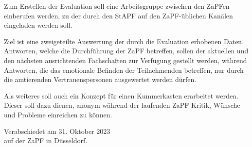 \documentclass[DIV=calc]{scrartcl}
\begin{document}
	Zum Erstellen der Evaluation soll eine Arbeitsgruppe zwischen den ZaPFen einberufen werden, zu der durch den StAPF auf den ZaPF-üblichen Kanälen eingeladen werden soll.
	
	Ziel ist eine zweigeteilte Auswertung der durch die Evaluation erhobenen Daten. Antworten, welche die Durchführung der ZaPF betreffen, sollen der aktuellen und den nächsten ausrichtenden Fachschaften zur Verfügung gestellt werden, während Antworten, die das emotionale Befinden der Teilnehmenden betreffen, nur durch die amtierenden Vertrauenspersonen ausgewertet werden dürfen.
	
	Als weiteres soll auch ein Konzept für einen Kummerkasten erarbeitet werden. Dieser soll dazu dienen, anonym während der laufenden ZaPF Kritik, Wünsche und Probleme einreichen zu können.
	
	
	\vfill
	\begin{flushright}
		Verabschiedet am 31. Oktober 2023 \\
		auf der ZaPF in Düsseldorf.
	\end{flushright}
	
\end{document}
